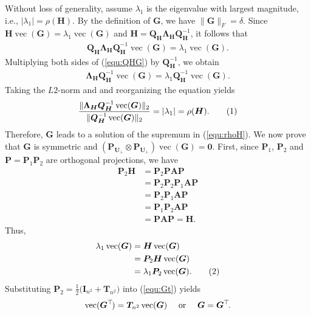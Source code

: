 \documentclass{article}
\newcommand{\norm}[1]{\|#1\|} %
\newcommand\abs[1]{\left|#1\right|}
\newcommand\numberthis{\addtocounter{equation}{1}\tag{\theequation}}
\DeclareMathOperator*{\vect}{vec}
\newcommand{\topnew}{\top \hspace{-0.05cm}}
\begin{document}
Without loss of generality, assume $\lambda_1$ is the eigenvalue with largest magnitude, i.e., $\abs{\lambda_1} = \rho(\bm H)$. By the definition of $\bm G$, we have $\norm{\bm G}_F = \delta$. Since $\bm H \vect(\bm G) = \lambda_1 \vect(\bm G)$ and $\bm H = \bm Q_{\bm H} \bm \Lambda_{\bm H} \bm Q^{-1}_{\bm H}$, it follows that
\begin{align} \label{equ:QHG}
    \bm Q_{\bm H} \bm \Lambda_{\bm H} \bm Q_{\bm H}^{-1} \vect(\bm G) = \lambda_1 \vect(\bm G).
\end{align}
Multiplying both sides of (\ref{equ:QHG}) by $\bm Q_{\bm H}^{-1}$, we obtain
\begin{align*}
    \bm \Lambda_{\bm H} \bm Q_{\bm H}^{-1} \vect(\bm G) = \lambda_1 \bm Q_{\bm H}^{-1}\vect(\bm G) . 
\end{align*}
Taking the $L2$-norm and and reorganizing the equation yields
\begin{align*}
     \frac{\norm{\bm \Lambda_{\bm H} \bm Q_{\bm H}^{-1} \vect(\bm G) }_2}{\norm{\bm Q_{\bm H}^{-1} \vect(\bm G)}_2} = \abs{\lambda_1} = \rho(\bm H) . \numberthis \label{equ:Grho}
\end{align*}
Therefore, $\bm G$ leads to a solution of the supremum in (\ref{equ:rhoH}). We now prove that $\bm G$ is symmetric and $(\bm P_{\bm U_\perp} \otimes \bm P_{\bm U_\perp}) \vect(\bm G) = \bm 0$.
First, since $\bm P_1$, $\bm P_2$ and $\bm P = \bm P_1 \bm P_2$ are orthogonal projections, we have
\begin{align*}
    \bm P_2 \bm H &= \bm P_2 \bm P \bm A \bm P \\
    &= \bm P_2 \bm P_2 \bm P_1 \bm A \bm P \\
    &= \bm P_2 \bm P_1 \bm A \bm P \\
    &= \bm P_1 \bm P_2 \bm A \bm P \\
    &= \bm P \bm A \bm P = \bm H .
\end{align*}
Thus, 
\begin{align*}
    \lambda_1 \vect(\bm G) &= \bm H \vect(\bm G) \\
    &= \bm P_2 \bm H \vect(\bm G) \\
    &= \lambda_1 \bm P_2 \vect(\bm G) . \numberthis \label{equ:Gt}
\end{align*}
Substituting $\bm P_2 = \frac{1}{2} \bigl(\bm I_{n^2} + \bm T_{n^2}\bigr)$ into (\ref{equ:Gt}) yields
\begin{align*}
    \vect(\bm G^\topnew) = \bm T_{n^2} \vect(\bm G) \quad \text{ or } \quad \bm G = \bm G^\topnew .
\end{align*}
\end{document}
